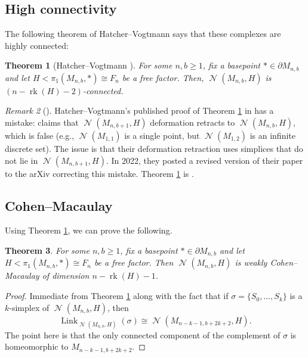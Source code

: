 \documentclass[11pt]{amsart}
\numberwithin{equation}{section}
\theoremstyle{plain}
\newtheorem{theorem}{Theorem}[section]
\theoremstyle{definition}
\theoremstyle{remark}
\newtheorem{rmk}[theorem]{Remark}
\newenvironment{remark}[1][]{\begin{rmk}[#1] \pushQED{\qed}}{\popQED \end{rmk}}
\DeclareMathOperator{\rank}{rk}
\DeclareMathOperator{\NSpheres}{\mathcal{N}}
\DeclareMathOperator{\Link}{Link}
\begin{document}
\subsection{High connectivity}
The following theorem of Hatcher--Vogtmann \cite{HatcherVogtmann, HatcherVogtmannRevised} says that these complexes are highly connected:

\begin{theorem}[{Hatcher--Vogtmann \cite{HatcherVogtmannRevised}}]
\label{theorem:nspherescon}
For some $n,b \geq 1$, fix a basepoint $\ast \in \partial M_{n,b}$
and let $H < \pi_1(M_{n,b},\ast) \cong F_n$ be a free factor.  Then,
$\NSpheres(M_{n,b},H)$ is $(n-\rank(H)-2)$-connected.
\end{theorem}

\begin{remark}
\label{remark:hatchervogtmannerror}
Hatcher--Vogtmann's published proof of Theorem \ref{theorem:nspherescon} in \cite{HatcherVogtmann}
has a mistake: \cite[Lemma 2.3]{HatcherVogtmann} claims that $\NSpheres(M_{n,b+1},H)$
deformation retracts to $\NSpheres(M_{n,b},H)$, which is false (e.g., $\NSpheres(M_{1,1})$ is a single
point, but $\NSpheres(M_{1,2})$ is an infinite discrete set).  The issue is that their
deformation retraction uses simplices that do not lie in $\NSpheres(M_{n,b+1},H)$.  
In 2022, they posted a revised version \cite{HatcherVogtmannRevised} of their paper to the arXiv
correcting this mistake.  Theorem \ref{theorem:nspherescon} is \cite[Theorem 2.5]{HatcherVogtmannRevised}.
\end{remark}

\subsection{Cohen--Macaulay}
Using Theorem \ref{theorem:nspherescon}, we can prove the following.

\begin{theorem}
\label{theorem:nspherescm}
For some $n,b \geq 1$, fix a basepoint $\ast \in \partial M_{n,b}$
and let $H < \pi_1(M_{n,b},\ast) \cong F_n$ be a free factor.
Then $\NSpheres(M_{n,b},H)$ is weakly Cohen--Macaulay of dimension $n-\rank(H)-1$.
\end{theorem}
\begin{proof}
Immediate from Theorem \ref{theorem:nspherescon} along with the fact that if
$\sigma = \{S_0,\ldots,S_k\}$ is a $k$-simplex of $\NSpheres(M_{n,b},H)$, then
\[\Link_{\NSpheres(M_{n,b},H)}(\sigma) \cong \NSpheres(M_{n-k-1,b+2k+2},H).\]
The point here is that the only connected component of the complement of $\sigma$
is homeomorphic to $M_{n-k-1,b+2k+2}$.
\end{proof}
\end{document}
